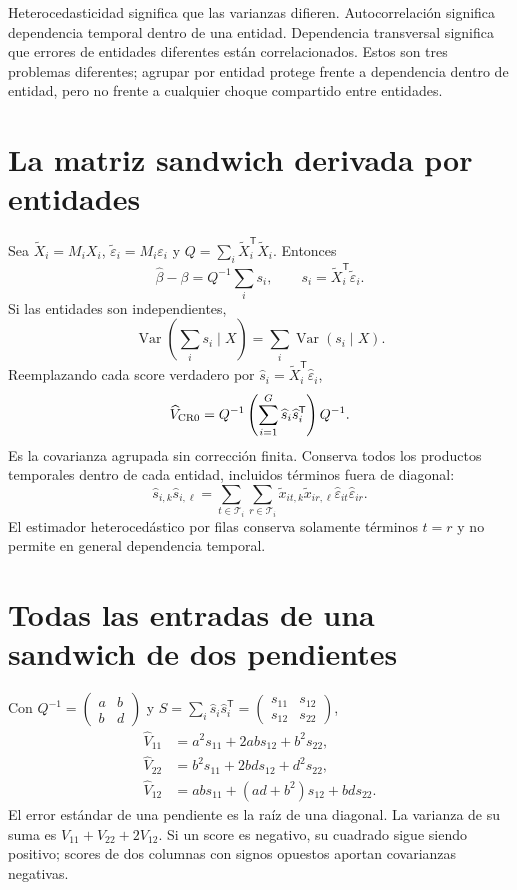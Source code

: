 \documentclass[11pt,a4paper]{article}
\newcommand{\T}{^{\mathsf T}}
\DeclareMathOperator{\Var}{Var}
\theoremstyle{definition}
\newcounter{problema}
\newcommand{\eps}{\varepsilon}
\begin{document}
Heterocedasticidad significa que las varianzas difieren. Autocorrelación significa dependencia temporal dentro de una entidad. Dependencia transversal significa que errores de entidades diferentes están correlacionados.
Estos son tres problemas diferentes; agrupar por entidad protege frente a dependencia dentro de entidad, pero no frente a cualquier choque compartido entre entidades.

\section{La matriz sandwich derivada por entidades}
Sea $\widetilde X_i=M_iX_i$, $\widetilde\eps_i=M_i\eps_i$ y
$Q=\sum_i\widetilde X_i\T\widetilde X_i$.
Entonces
\[
\widehat\beta-\beta=Q^{-1}\sum_i s_i,\qquad
s_i=\widetilde X_i\T\widetilde\eps_i.
\]
Si las entidades son independientes,
\[
\Var\left(\sum_i s_i\mid X\right)=\sum_i\Var(s_i\mid X).
\]
Reemplazando cada score verdadero por
$\widehat s_i=\widetilde X_i\T\widehat\eps_i$,
\[
\widehat V_{\rm CR0}
=Q^{-1}\left(\sum_{i=1}^G\widehat s_i\widehat s_i\T\right)Q^{-1}.
\]
Es la covarianza agrupada sin corrección finita. Conserva todos los productos temporales dentro de cada entidad, incluidos términos fuera de diagonal:
\[
\widehat s_{i,k}\widehat s_{i,\ell}
=\sum_{t\in\mathcal T_i}\sum_{r\in\mathcal T_i}
\widetilde x_{it,k}\widetilde x_{ir,\ell}
\widehat\eps_{it}\widehat\eps_{ir}.
\]
El estimador heterocedástico por filas conserva solamente términos $t=r$ y no permite en general dependencia temporal.

\section{Todas las entradas de una sandwich de dos pendientes}
Con
$Q^{-1}=\begin{pmatrix}a&b\\b&d\end{pmatrix}$ y
$S=\sum_i\widehat s_i\widehat s_i\T=
\begin{pmatrix}s_{11}&s_{12}\\s_{12}&s_{22}\end{pmatrix}$,
\[
\begin{aligned}
\widehat V_{11}&=a^2s_{11}+2abs_{12}+b^2s_{22},\\
\widehat V_{22}&=b^2s_{11}+2bds_{12}+d^2s_{22},\\
\widehat V_{12}&=abs_{11}+(ad+b^2)s_{12}+bds_{22}.
\end{aligned}
\]
El error estándar de una pendiente es la raíz de una diagonal. La varianza de su suma es $V_{11}+V_{22}+2V_{12}$.
Si un score es negativo, su cuadrado sigue siendo positivo; scores de dos columnas con signos opuestos aportan covarianzas negativas.
\end{document}
